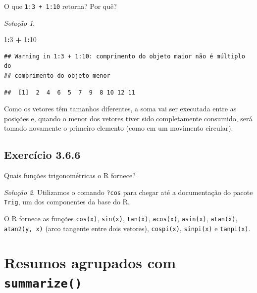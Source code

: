 \documentclass[
]{latex/krantz}
\newenvironment{Shaded}{\begin{snugshade}}{\end{snugshade}}
\newcommand{\DecValTok}[1]{\textcolor[rgb]{0.00,0.00,0.81}{#1}}
\newcommand{\SpecialCharTok}[1]{\textcolor[rgb]{0.81,0.36,0.00}{\textbf{#1}}}
\theoremstyle{definition}
\theoremstyle{definition}
\theoremstyle{definition}
\theoremstyle{definition}
\theoremstyle{remark}
\newtheorem*{solution}{Solução}
\begin{document}
O que \texttt{1:3\ +\ 1:10} retorna? Por quê?

\begin{solution}
\leavevmode

\begin{Shaded}
\begin{Highlighting}[]
\DecValTok{1}\SpecialCharTok{:}\DecValTok{3} \SpecialCharTok{+} \DecValTok{1}\SpecialCharTok{:}\DecValTok{10}
\end{Highlighting}
\end{Shaded}

\begin{verbatim}
## Warning in 1:3 + 1:10: comprimento do objeto maior não é múltiplo do
## comprimento do objeto menor
\end{verbatim}

\begin{verbatim}
##  [1]  2  4  6  5  7  9  8 10 12 11
\end{verbatim}

Como os vetores têm tamanhos diferentes, a soma vai ser executada entre as posições e, quando o menor dos vetores tiver sido completamente consumido, será tomado novamente o primeiro elemento (como em um movimento circular).

\end{solution}

\hypertarget{exr3-6-6}{%
\subsection*{Exercício 3.6.6}\label{exr3-6-6}}

Quais funções trigonométricas o R fornece?

\begin{solution}
Utilizamos o comando \texttt{?cos} para chegar até a documentação do pacote \texttt{Trig}, um dos componentes da base do R.

O R fornece as funções \texttt{cos(x)}, \texttt{sin(x)}, \texttt{tan(x)}, \texttt{acos(x)}, \texttt{asin(x)}, \texttt{atan(x)}, \texttt{atan2(y,\ x)} (arco tangente entre dois vetores), \texttt{cospi(x)}, \texttt{sinpi(x)} e \texttt{tanpi(x)}.
\end{solution}

\hypertarget{resumos-agrupados-com-summarize}{%
\section{\texorpdfstring{Resumos agrupados com \texttt{summarize()}}{Resumos agrupados com summarize()}}\label{resumos-agrupados-com-summarize}}
\end{document}
